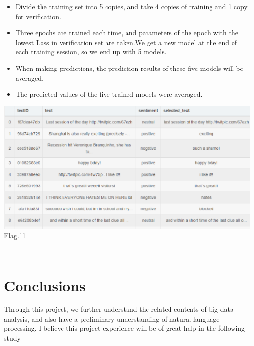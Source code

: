 \begin{itemize}
  \item Divide the training set into 5 copies, and take 4 copies of training and 1 copy for verification.
  \item Three epochs are trained each time, and parameters of the epoch with the lowest Loss in verification set are taken.We get a new model at the end of each training session, so we end up with 5 models.
  \item When making predictions, the prediction results of these five models will be averaged.
  \item The predicted values of the five trained models were averaged.
\end{itemize}
\begin{center}
  \begin{minipage}{1\linewidth}
  \centering
  \includegraphics[width=1\textwidth]{kaggle/1.7.eps}
  {\small{Flag.11}}
  \end{minipage}
  \hfill
  \\

  
\end{center}

\section{Conclusions}

Through this project, we further understand the related contents of
 big data analysis, and also have a preliminary understanding of natural
  language processing. I believe this project experience will be of 
  great help in the following study.
